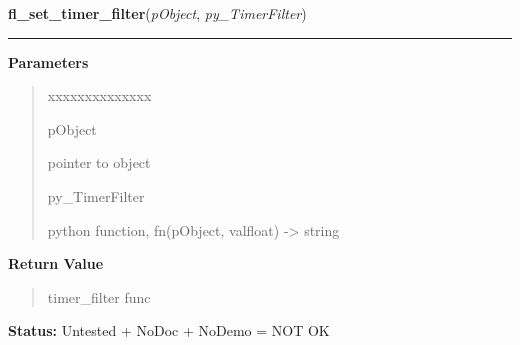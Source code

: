 \hspace{.8\funcindent}\begin{boxedminipage}{\funcwidth}

    \raggedright \textbf{fl\_set\_timer\_filter}(\textit{pObject}, \textit{py\_TimerFilter})

    \vspace{-1.5ex}

    \rule{\textwidth}{0.5\fboxrule}
\setlength{\parskip}{2ex}
\setlength{\parskip}{1ex}
      \textbf{Parameters}
      \vspace{-1ex}

      \begin{quote}
        \begin{Ventry}{xxxxxxxxxxxxxx}

          \item[pObject]

          pointer to object

          \item[py\_TimerFilter]

          python function, fn(pObject, valfloat) -{\textgreater} string

        \end{Ventry}

      \end{quote}

      \textbf{Return Value}
    \vspace{-1ex}

      \begin{quote}
      timer\_filter func

      \end{quote}

\textbf{Status:} Untested + NoDoc + NoDemo = NOT OK



    \end{boxedminipage}

    \label{xformslib:library:fl_suspend_timer}

    \vspace{0.5ex}

